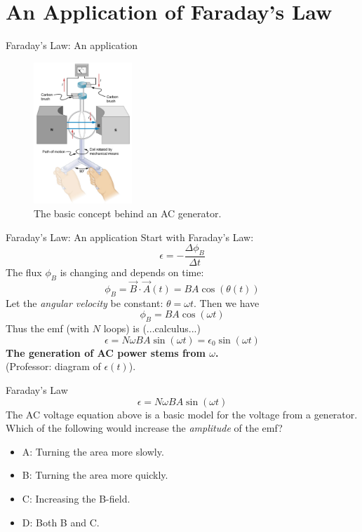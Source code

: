 \documentclass{beamer}
\begin{document}
\section{An Application of Faraday's Law}

\begin{frame}{Faraday's Law: An application}
\small
\begin{figure}
\centering
\includegraphics[width=0.33\textwidth]{figures/gen1.png}
\caption{\label{fig:gen1} The basic concept behind an AC generator.}
\end{figure}
\end{frame}

\begin{frame}{Faraday's Law: An application}
Start with Faraday's Law:
\begin{equation}
\epsilon = - \frac{\Delta \phi_B}{\Delta t}
\end{equation}
The flux $\phi_B$ is changing and depends on time:
\begin{equation}
\phi_B = \vec{B} \cdot \vec{A}(t) = BA\cos(\theta(t))
\end{equation}
Let the \textit{angular velocity} be constant: $\theta = \omega t$.  Then we have
\begin{equation}
\phi_B  = BA\cos(\omega t)
\end{equation}
Thus the emf (with $N$ loops) is (...calculus...)
\begin{equation}
\epsilon = N\omega BA \sin(\omega t) = \epsilon_0 \sin(\omega t)
\end{equation}
\textbf{The generation of AC power stems from $\omega$.} \\ (Professor: diagram of $\epsilon(t)$).
\end{frame}

\begin{frame}{Faraday's Law}
\begin{equation}
\epsilon = N\omega BA \sin(\omega t)
\end{equation}
The AC voltage equation above is a basic model for the voltage from a generator.  Which of the following would increase the \textit{amplitude} of the emf?
\begin{itemize}
\item A: Turning the area more slowly.
\item B: Turning the area more quickly.
\item C: Increasing the B-field.
\item D: Both B and C.
\end{itemize}
\end{frame}
\end{document}
